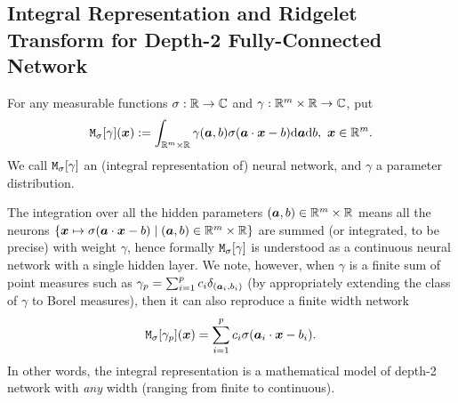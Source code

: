 \subsection{Integral Representation and Ridgelet Transform for Depth-2 Fully-Connected Network}

\begin{definition} For any measurable functions $\sigma:\RR\to\CC$ and $\gamma:\RR^m\times\RR\to\CC$, put
	\begin{align*}
		\lm_\sigma[\gamma](\xx) := \int_{\RR^m\times\RR} \gamma(\aa,b)\sigma(\aa\cdot\xx-b)\dd\aa\dd b, \ \xx \in \RR^m.
	\end{align*}
	We call
	$\lm_\sigma[\gamma]$ an (integral representation of) neural network, and $\gamma$ a parameter distribution.
\end{definition}
The integration over all the hidden parameters $(\aa,b) \in \RR^m\times\RR$ means all the neurons $\{ \xx\mapsto\sigma(\aa\cdot\xx-b) \mid (\aa,b) \in \RR^m\times\RR \}$ are summed (or integrated, to be precise) with weight $\gamma$, hence formally $\lm_\sigma[\gamma]$ is understood as a continuous neural network with a single hidden layer.
We note, however, when $\gamma$ is a finite sum of point measures such as $\gamma_p = \sum_{i=1}^p c_i \delta_{(\aa_i,b_i)}$ (by appropriately extending the class of $\gamma$ to Borel measures), then it can also reproduce a finite width network
\begin{align*}
	\lm_\sigma[\gamma_p](\xx) = \sum_{i=1}^p c_i \sigma(\aa_i\cdot\xx-b_i).
\end{align*}
In other words, the integral representation is a mathematical model of depth-2 network with \emph{any} width (ranging from finite to continuous).

